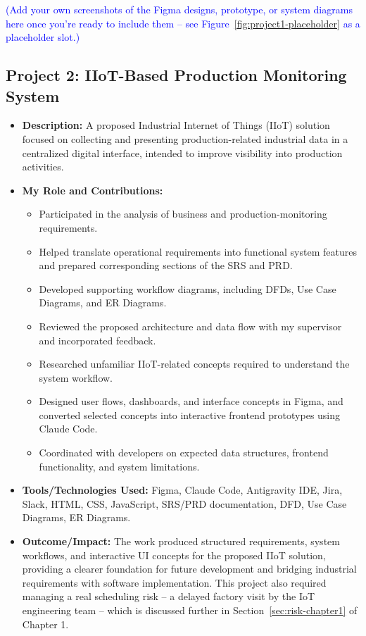 \textcolor{blue}{\small (Add your own screenshots of the Figma designs, prototype, or system diagrams here once you're ready to include them -- see Figure~\ref{fig:project1-placeholder} as a placeholder slot.)}

\subsection{Project 2: IIoT-Based Production Monitoring System}
\begin{itemize}
    \item \textbf{Description:} A proposed Industrial Internet of Things (IIoT) solution focused on collecting and presenting production-related industrial data in a centralized digital interface, intended to improve visibility into production activities.
    \item \textbf{My Role and Contributions:}
    \begin{itemize}
        \item Participated in the analysis of business and production-monitoring requirements.
        \item Helped translate operational requirements into functional system features and prepared corresponding sections of the SRS and PRD.
        \item Developed supporting workflow diagrams, including DFDs, Use Case Diagrams, and ER Diagrams.
        \item Reviewed the proposed architecture and data flow with my supervisor and incorporated feedback.
        \item Researched unfamiliar IIoT-related concepts required to understand the system workflow.
        \item Designed user flows, dashboards, and interface concepts in Figma, and converted selected concepts into interactive frontend prototypes using Claude Code.
        \item Coordinated with developers on expected data structures, frontend functionality, and system limitations.
    \end{itemize}
    \item \textbf{Tools/Technologies Used:} Figma, Claude Code, Antigravity IDE, Jira, Slack, HTML, CSS, JavaScript, SRS/PRD documentation, DFD, Use Case Diagrams, ER Diagrams.
    \item \textbf{Outcome/Impact:} The work produced structured requirements, system workflows, and interactive UI concepts for the proposed IIoT solution, providing a clearer foundation for future development and bridging industrial requirements with software implementation. This project also required managing a real scheduling risk -- a delayed factory visit by the IoT engineering team -- which is discussed further in Section~\ref{sec:risk-chapter1} of Chapter 1.
\end{itemize}

